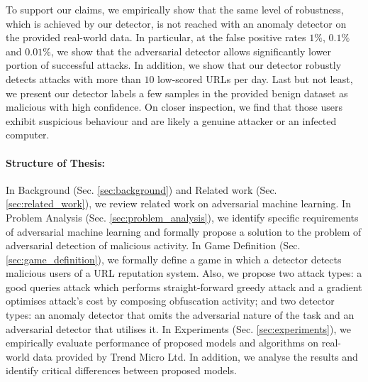 To support our claims, we empirically show that the same level of robustness, which is achieved by our detector, is not reached with an anomaly detector on the provided real-world data. In particular, at the false positive rates $1\%$, $0.1\%$ and $0.01\%$, we show that the adversarial detector allows significantly lower portion of successful attacks. In addition, we show that our detector robustly detects attacks with more than $10$ low-scored URLs per day. Last but not least, we present our detector labels a few samples in the provided benign dataset as malicious with high confidence. On closer inspection, we find that those users exhibit suspicious behaviour and are likely a genuine attacker or an infected computer.

\paragraph{Structure of Thesis:}
In Background (Sec. \ref{sec:background}) and Related work (Sec. \ref{sec:related_work}), we review related work on adversarial machine learning. In Problem Analysis (Sec. \ref{sec:problem_analysis}), we identify specific requirements of adversarial machine learning and formally propose a solution to the problem of adversarial detection of malicious activity. In Game Definition (Sec. \ref{sec:game_definition}), we formally define a game in which a detector detects malicious users of a URL reputation system. Also, we propose two attack types: a good queries attack which performs straight-forward greedy attack and a gradient optimises attack's cost by composing obfuscation activity; and two detector types: an anomaly detector that omits the adversarial nature of the task and an adversarial detector that utilises it.
In Experiments (Sec. \ref{sec:experiments}), we empirically evaluate performance of proposed models and algorithms on real-world data provided by Trend Micro Ltd. In addition, we analyse the results and identify critical differences between proposed models.
